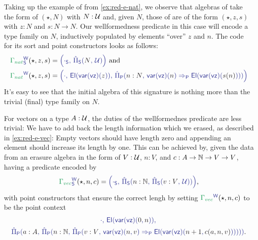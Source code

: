 \begin{example}\label{ex:red-w-nat}
Taking up the example of  from \ref{ex:red-e-nat},
we observe that algebras of  take the form of
$(\star, N)$ with $N : \mathcal{U}$ and, given $N$, those of
 are of the form $(\star, z, s)$ with
$z : N$ and $s : N \to N$.
Our wellformedness predicate in this case will encode a type family on $N$, inductively
populated by elements ``over'' $z$ and $n$.
The code for its sort and point constructors looks as follows:
\begin{align*}
\tqm{\grm{\Gamma_{nat}}^\WW_\Sc}(\star, z, s)
  &= \tqm{\left( \cdot_\Sc,\, \ExtPiS{N}{\UU} \right)} \text{ and} \\
\tqm{\grm{\Gamma_{nat}}^\WW}(\star, z, s)
  &= \tqm{\left( \cdot,\,  \El(\var(\vz)(\blm{z})),\,
    \ExtPiP{n : N}{\var(\vz)(\blm{n}) \Rightarrow_\Pc \El(\var(\vz)(\blm{s(n)}))} \right)}
\end{align*} %
It's easy to see that the initial algebra of this signature is nothing more than
the trivial (final) type family on $N$.
\end{example}

\begin{example}[Vectors]\label{ex:red-w-vec}
For vectors on a type $A : \mathcal{U}$, the duties of the wellformednes predicate are less trivial:
We have to add back the length information which we erased, as described in
\ref{ex:red-e-vec}:
Empty vectors should have length zero and appending an element should increase its
length by one.
This can be achieved by, given the data from an erasure algebra in the form of
$V : \mathcal{U}$, $n: V$, and $c : A \to \mathbb{N} \to V \to V$,
having a predicate encoded by
\begin{equation*}
\tqm{\grm{\Gamma_{vec}}^\WW_\Sc}(\star, n, c)
  = \tqm{\left(\cdot_\Sc,\, \ExtPiS{n : \N}{\ExtPiS{v : V}{\UU}} \right)} \text{,}
\end{equation*}
with point constructors that ensure the correct lengh by setting $\tqm{\grm{\Gamma_{vec}}^\WW}(\star, n, c)$ to be the point context
\begin{equation*}
\begin{gathered}
\tqm{\cdot,\, \El(\var(\vz)(\blm{0}, \blm{n})),\,} \\
\tqm{\ExtPiP{a: A}{\ExtPiP{n : \N}{\ExtPiP{v : V}{\var(\vz)(\blm{n}, \blm{v}) \Rightarrow_\Pc 
  \El(\var(\vz)(\blm{n + 1}, \blm{c(a, n, v)}) ) } } } } \text{.}
\end{gathered}
\end{equation*}
\end{example}

